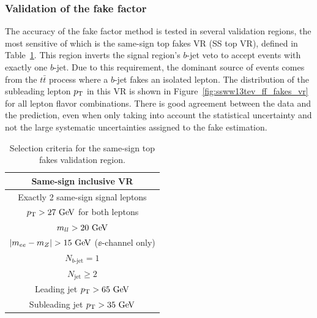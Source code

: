 \subsubsection{Validation of the fake factor}\label{ssww13tev:ff_vr}
The accuracy of the fake factor method is tested in several validation regions, the most sensitive of which is the same-sign top fakes VR (SS top VR), defined in Table~\ref{tab:ssww13tev_topfakes_vr_def}.
This region inverts the signal region's $b$-jet veto to accept events with exactly one $b$-jet.
Due to this requirement, the dominant source of events comes from the $t\bar{t}$ process where a $b$-jet fakes an isolated lepton.
The distribution of the subleading lepton $p_{\mathrm{T}}$ in this VR is shown in Figure~\ref{fig:ssww13tev_ff_fakes_vr} for all lepton flavor combinations.
There is good agreement between the data and the prediction, even when only taking into account the statistical uncertainty and not the large systematic uncertainties assigned to the fake estimation.

\begin{table}[htbp]
  \centering
  \begin{tabular}{c}
    Same-sign inclusive VR \\
    \hline\hline
    Exactly 2 same-sign signal leptons\\
    $\pt > 27\gev$ for both leptons \\
    $m_{ll} > 20\gev$\\
    $|m_{ee} - m_Z| > 15\gev$ ($\ee$-channel only) \\
    $N_{b\textrm{-jet}} = 1$\\
    $N_{\textrm{jet}} \ge 2$ \\
    Leading jet $\pt > 65\gev$ \\
    Subleading jet $\pt > 35\gev$ \\
    \hline
  \end{tabular}
  \caption{Selection criteria for the same-sign top fakes validation region.}
  \label{tab:ssww13tev_topfakes_vr_def}
\end{table}

